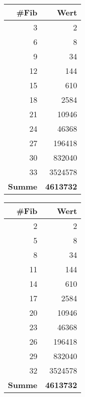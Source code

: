 \begin{center}
\small\renewcommand{\arraystretch}{1.4}
\small
{} %
\begin{tabularx}{0.25\textwidth}{rr}
\rowcolor{tableheadcolor}
\hline
\textbf{\#Fib} & \textbf{Wert} \\
\hline
3 & 2 \\
6 & 8 \\
9 & 34 \\
12 & \num{144} \\
15 & \num{610} \\
18 & \num{2584} \\
21 & \num{10946} \\
24 & \num{46368} \\
27 & \num{196418} \\
30 & \num{832040} \\
33 & \num{3524578} \\
\hline
\rowcolor{tablesubheadcolor}
\textbf{Summe} & \textbf{\num{4613732}}\\
\hline
\end{tabularx}
\end{center}


\begin{table}[ht]
\centering
%
\label{tab:IsingModel}
%
\begin{tabularx}{0.3\textwidth}{r r}
\hline
\rowcolor{tableheadcolor}
\textbf{\#Fib} & \textbf{Wert} \\
\hline
2 & 2 \\
5 & 8 \\
8 & 34 \\
11 & \num{144} \\
14 & \num{610} \\
17 & \num{2584} \\
20 & \num{10946} \\
23 & \num{46368} \\
26 & \num{196418} \\
29 & \num{832040} \\
32 & \num{3524578} \\
\hline
\textbf{Summe} & \textbf{\num{4613732}}\\
\hline
\end{tabularx}
\end{table}